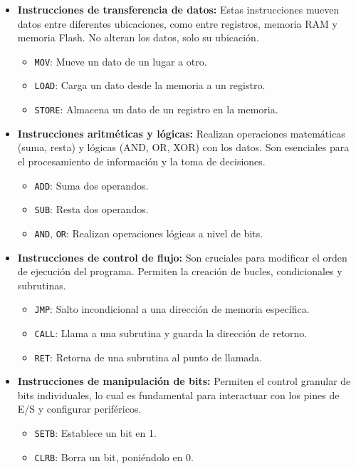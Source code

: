 \documentclass[a4paper,12pt]{article}
\begin{document}
	\begin{itemize}
		\item \textbf{Instrucciones de transferencia de datos:} Estas instrucciones mueven datos entre diferentes ubicaciones, como entre registros, memoria RAM y memoria Flash. No alteran los datos, solo su ubicación.
		\begin{itemize}
			\item \texttt{MOV}: Mueve un dato de un lugar a otro.
			\item \texttt{LOAD}: Carga un dato desde la memoria a un registro.
			\item \texttt{STORE}: Almacena un dato de un registro en la memoria.
		\end{itemize}
		\item \textbf{Instrucciones aritméticas y lógicas:} Realizan operaciones matemáticas (suma, resta) y lógicas (AND, OR, XOR) con los datos. Son esenciales para el procesamiento de información y la toma de decisiones.
		\begin{itemize}
			\item \texttt{ADD}: Suma dos operandos.
			\item \texttt{SUB}: Resta dos operandos.
			\item \texttt{AND}, \texttt{OR}: Realizan operaciones lógicas a nivel de bits.
		\end{itemize}
		\item \textbf{Instrucciones de control de flujo:} Son cruciales para modificar el orden de ejecución del programa. Permiten la creación de bucles, condicionales y subrutinas.
		\begin{itemize}
			\item \texttt{JMP}: Salto incondicional a una dirección de memoria específica.
			\item \texttt{CALL}: Llama a una subrutina y guarda la dirección de retorno.
			\item \texttt{RET}: Retorna de una subrutina al punto de llamada.
		\end{itemize}
		\item \textbf{Instrucciones de manipulación de bits:} Permiten el control granular de bits individuales, lo cual es fundamental para interactuar con los pines de E/S y configurar periféricos.
		\begin{itemize}
			\item \texttt{SETB}: Establece un bit en 1.
			\item \texttt{CLRB}: Borra un bit, poniéndolo en 0.
		\end{itemize}
	\end{itemize}
	
\end{document}
